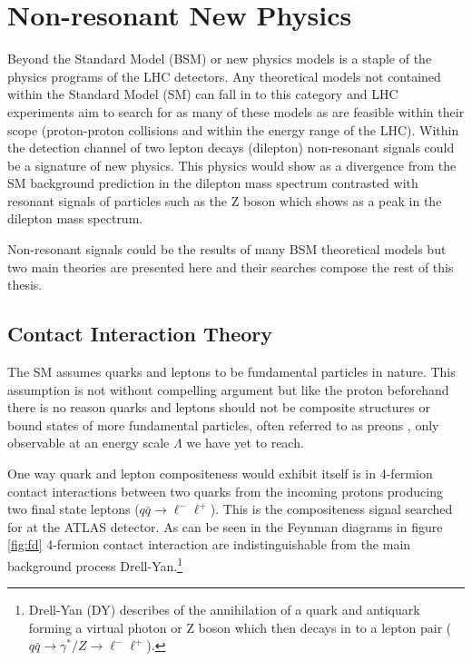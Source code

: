 


\section{Non-resonant New Physics}

    Beyond the Standard Model (BSM) or new physics models is a staple of the physics programs of the LHC detectors. Any theoretical models not contained within the Standard Model (SM) can fall in to this category and LHC experiments aim to search for as many of these models as are feasible within their scope (proton-proton collisions and within the energy range of the LHC). Within the detection channel of two lepton decays (dilepton) non-resonant signals could be a signature of new physics. This physics would show as a divergence from the SM background prediction in the dilepton mass spectrum contrasted with resonant signals of particles such as the Z boson which shows as a peak in the dilepton mass spectrum.

    Non-resonant signals could be the results of many BSM theoretical models but two main theories are presented here and their searches compose the rest of this thesis.


    \subsection{Contact Interaction Theory}
        \label{sec:CItheory}

        The SM assumes quarks and leptons to be fundamental particles in nature. This assumption is not without compelling argument but like the proton beforehand there is no reason quarks and leptons should not be composite structures or bound states of more fundamental particles, often referred to as preons \cite{Eichten:1983hw}, only observable at an energy scale $\Lambda$ we have yet to reach. 

        One way quark and lepton compositeness would exhibit itself is in 4-fermion contact interactions between two quarks from the incoming protons producing two final state leptons ($q\bar{q} \rightarrow \ell^{-}\ell^{+}$). This is the compositeness signal searched for at the ATLAS detector. As can be seen in the Feynman diagrams in figure \ref{fig:fd} 4-fermion contact interaction are indistinguishable from the main background process Drell-Yan.\footnote{Drell-Yan (DY) describes of the annihilation of a quark and antiquark forming a virtual photon or Z boson which then decays in to a lepton pair ($q\bar{q} \rightarrow \gamma^{*}/Z \rightarrow \ell^{-}\ell^{+}$).}

